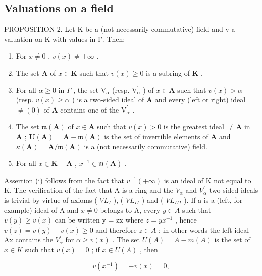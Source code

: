 \subsection{Valuations on a field}

PROPOSITION 2. Let K be a (not necessarily commutative) field and v a valuation on K with values in Γ. Then:

\begin{enumerate}
\def\labelenumi{(\roman{enumi})}
\item
  For \(x \neq 0\) , \(v(x) \neq +\infty\) .
\item
  The set \(\mathbf{A}\) of \(x\in \mathbf{K}\) such that \(v(x)\geqslant 0\) is a subring of \(\mathbf{K}\) .
\item
  For all \(\alpha \geqslant 0\) in \(\Gamma\) , the set \(\mathrm{V}_{\alpha}\) (resp. \(\mathrm{V}_{\alpha}^{\prime}\) ) of \(x \in \mathbf{A}\) such that \(v(x) > \alpha\) (resp. \(v(x) \geqslant \alpha\) ) is a two-sided ideal of \(\mathbf{A}\) and every (left or right) ideal \(\neq (0)\) of \(\mathbf{A}\) contains one of the \(\mathrm{V}_{\alpha}^{\prime}\) .
\item
  The set \(\mathfrak{m}(\mathbf{A})\) of \(x \in \mathbf{A}\) such that \(v(x) > 0\) is the greatest ideal \(\neq \mathbf{A}\) in \(\mathbf{A}\) ; \(\mathbf{U}(\mathbf{A}) = \mathbf{A} - \mathfrak{m}(\mathbf{A})\) is the set of invertible elements of \(\mathbf{A}\) and \(\kappa(\mathbf{A}) = \mathbf{A} / \mathfrak{m}(\mathbf{A})\) is a (not necessarily commutative) field.
\item
  For all \(x \in \mathbf{K} - \mathbf{A}\) , \(x^{-1} \in \mathfrak{m}(\mathbf{A})\) .
\end{enumerate}

Assertion (i) follows from the fact that \(\overline{v}^{-1}(+\infty)\) is an ideal of K not equal to K. The verification of the fact that A is a ring and the \(V_{\alpha}\) and \(V_{\alpha}^{\prime}\) two-sided ideals is trivial by virtue of axioms ( \(VL_{I}\) ), ( \(VL_{II}\) ) and ( \(VL_{III}\) ). If a is a (left, for example) ideal of A and \(x \neq 0\) belongs to A, every \(y \in A\) such that \(v(y) \geqslant v(x)\) can be written y = zx where \(z = yx^{-1}\) , hence \(v(z) = v(y) - v(x) \geqslant 0\) and therefore \(z \in A\) ; in other words the left ideal Ax contains the \(V_{\alpha}^{\prime}\) for \(\alpha \geqslant v(x)\) . The set \(U(A) = A - m(A)\) is the set of \(x \in K\) such that \(v(x) = 0\) ; if \(x \in U(A)\) , then

\[
v (x ^ {- 1}) = - v (x) = 0,
\]

